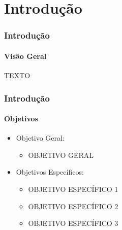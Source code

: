



\section{Introdução}

\begin{frame}
    \frametitle{Introdução}
    \framesubtitle{Visão Geral}
    \center

        TEXTO
        
\end{frame}


\begin{frame}
    \frametitle{Introdução}
    \framesubtitle{Objetivos}
    \begin{itemize}
        
        \item Objetivo Geral:
        \begin{itemize}
        
            \item OBJETIVO GERAL

        \end{itemize}
        
        \item Objetivos Específicos:
        \begin{itemize}

            \item OBJETIVO ESPECÍFICO 1
            \item OBJETIVO ESPECÍFICO 2
            \item OBJETIVO ESPECÍFICO 3

        \end{itemize}
        
    \end{itemize}
\end{frame}

